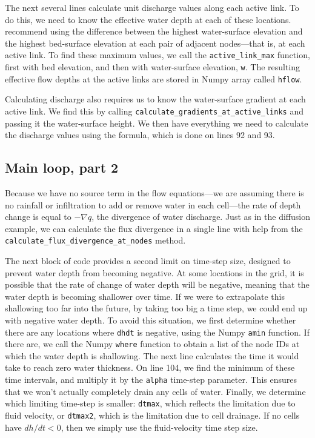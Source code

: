 \documentclass[12pt]{article}
\newcommand{\code}[1]{{\tt #1}}
\begin{document}
The next several lines calculate unit discharge values along each active link. To do this, we need to know the effective water depth at each of these locations. \citet{bates2010simple} recommend using the difference between the highest water-surface elevation and the highest bed-surface elevation at each pair of adjacent nodes---that is, at each active link. To find these maximum values, we call the \code{active\_link\_max} function, first with bed elevation, and then with water-surface elevation, \code{w}. The resulting effective flow depths at the active links are stored in Numpy array called \code{hflow}. 

Calculating discharge also requires us to know the water-surface gradient at each active link. We find this by calling \code{calculate\_gradients\_at\_active\_links} and passing it the water-surface height. We then have everything we need to calculate the discharge values using the \citet{bates2010simple} formula, which is done on lines 92 and 93.

\subsection{Main loop, part 2}



Because we have no source term in the flow equations---we are assuming there is no rainfall or infiltration to add or remove water in each cell---the rate of depth change is equal to $-\nabla q$, the divergence of water discharge. Just as in the diffusion example, we can calculate the flux divergence in a single line with help from the \code{calculate\_flux\_divergence\_at\_nodes} method.

The next block of code provides a second limit on time-step size, designed to prevent water depth from becoming negative. At some locations in the grid, it is possible that the rate of change of water depth will be negative, meaning that the water depth is becoming shallower over time. If we were to extrapolate this shallowing too far into the future, by taking too big a time step, we could end up with negative water depth. To avoid this situation, we first determine whether there are any locations where \code{dhdt} is negative, using the Numpy \code{amin} function. If there are, we call the Numpy \code{where} function to obtain a list of the node IDs at which the water depth is shallowing. The next line calculates the time it would take to reach zero water thickness. On line 104, we find the minimum of these time intervals, and multiply it by the \code{alpha} time-step parameter. This ensures that we won't actually completely drain any cells of water. Finally, we determine which limiting time-step is smaller: \code{dtmax}, which reflects the limitation due to fluid velocity, or \code{dtmax2}, which is the limitation due to cell drainage. If no cells have $dh/dt<0$, then we simply use the fluid-velocity time step size.
\end{document}
